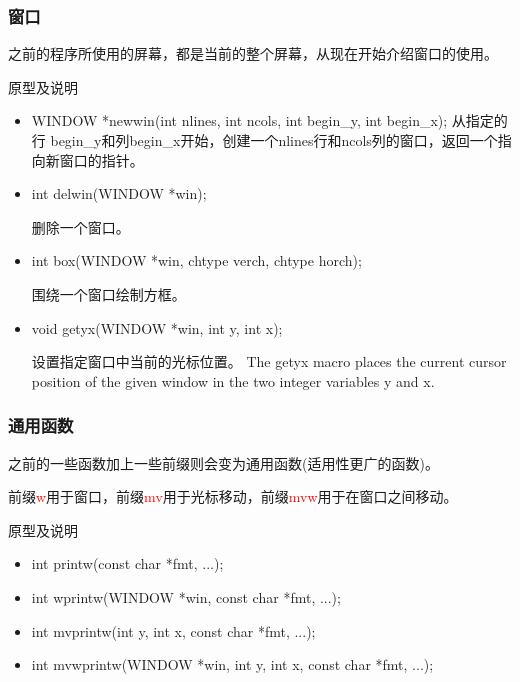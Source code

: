 \documentclass{beamer}
\begin{document}
\begin{frame}
\frametitle{窗口}
之前的程序所使用的屏幕，都是当前的整个屏幕，从现在开始介绍窗口的使用。
\begin{block}{原型及说明}
\begin{itemize}
\item
WINDOW *newwin(int nlines, int ncols, int begin\_y,
             int begin\_x);
从指定的行 begin\_y和列begin\_x开始，创建一个nlines行和ncols列的窗口，返回一个指向新窗口的指针。          
\item
int delwin(WINDOW *win);

删除一个窗口。
\item
int box(WINDOW *win, chtype verch, chtype horch);

围绕一个窗口绘制方框。
\item
void getyx(WINDOW *win, int y, int x);

设置指定窗口中当前的光标位置。
The getyx macro places the current cursor position of the given window in the two integer variables y and x.
\end{itemize}
\end{block}

\end{frame}


\begin{frame}
\frametitle{通用函数}
之前的一些函数加上一些前缀则会变为通用函数(适用性更广的函数)。

前缀\textcolor{red}{w}用于窗口，前缀\textcolor{red}{mv}用于光标移动，前缀\textcolor{red}{mvw}用于在窗口之间移动。


\begin{block}{原型及说明}
\begin{itemize}
\item
int printw(const char *fmt, ...);
\item
int wprintw(WINDOW *win, const char *fmt, ...);
\item
int mvprintw(int y, int x, const char *fmt, ...);
\item
int mvwprintw(WINDOW *win, int y, int x, const char *fmt, ...);
\end{itemize}
\end{block}

\end{frame}

\end{document}

